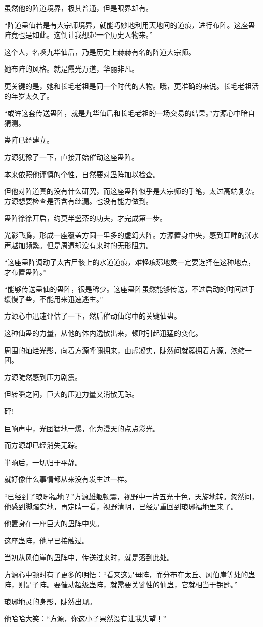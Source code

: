 \begin{this_body}
虽然他的阵道境界，极其普通，但是眼界却有。

“阵道蛊仙若是有大宗师境界，就能巧妙地利用天地间的道痕，进行布阵。这座蛊阵竟也是如此。这倒让我想起一个历史人物来。”

这个人，名唤九华仙后，乃是历史上赫赫有名的阵道大宗师。

她布阵的风格。就是霞光万道，华丽非凡。

更关键的是，她和长毛老祖是同一个时代的人物。哦，更准确的来说。长毛老祖活的年岁太久了。

“或许这套传送蛊阵，就是九华仙后和长毛老祖的一场交易的结果。”方源心中暗自猜测。

蛊阵已经建立。

方源犹豫了一下，直接开始催动这座蛊阵。

本来依照他谨慎的个性，自然要对蛊阵加以检查。

但他对阵道真的没有什么研究，而这座蛊阵似乎是大宗师的手笔，太过高端复杂。方源想要检查是否含有纰漏。也没有能力做到。

蛊阵徐徐开启，约莫半盏茶的功夫，才完成第一步。

光影飞腾，形成一座覆盖方圆一里多的虚幻大阵。方源置身中央，感到耳畔的潮水声越加频繁。但是周遭却没有来时的无形阻力。

“这座蛊阵调动了太古尸骸上的水道道痕，难怪琅琊地灵一定要选择在这种地点，才布置蛊阵。”

“能够传送蛊仙的蛊阵，很是稀少。这座蛊阵虽然能够传送，不过启动的时间过于缓慢了些，不能用来迅速逃生。”

方源心中迅速评估了一下，然后催动仙窍中的关键仙蛊。

这种仙蛊的力量，从他的体内逸散出来，顿时引起迅猛的变化。

周围的灿烂光影，向着方源呼啸拥来，由虚凝实，陡然间就簇拥着方源，浓缩一团。

方源陡然感到压力剧震。

但转瞬之间，巨大的压迫力量又消散无踪。

砰!

巨响声中，光团猛地一爆，化为漫天的点点彩光。

而方源却已经消失无踪。

半晌后，一切归于平静。

就好像什么事情都从来没有发生过一样。

“已经到了琅琊福地？”方源雄躯顿震，视野中一片五光十色，天旋地转。忽然间，他感到脚踏实地，再定睛一看，视野清明，已经是重回到琅琊福地里来了。

他置身在一座巨大的蛊阵中央。

这座蛊阵，他早已接触过。

当初从风伯崖的蛊阵中，传送过来时，就是落到此处。

方源心中顿时有了更多的明悟：“看来这是母阵，而分布在太丘、风伯崖等处的蛊阵，则是子阵。要催动超级蛊阵，就需要关键性的仙蛊，它就相当于钥匙。”

琅琊地灵的身影，陡然出现。

他哈哈大笑：“方源，你这小子果然没有让我失望！”

\end{this_body}

